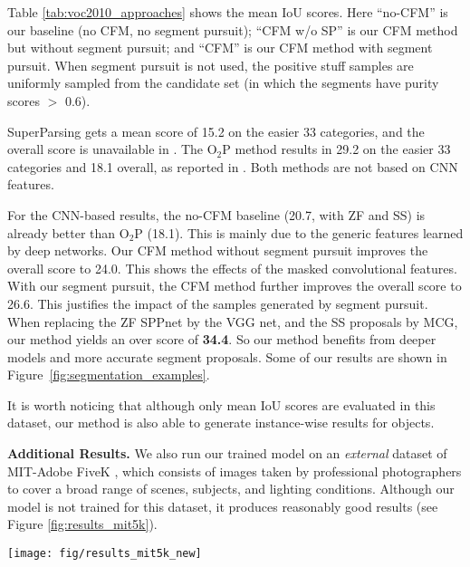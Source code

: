\documentclass[10pt,twocolumn,letterpaper]{article}
\begin{document}
Table \ref{tab:voc2010_approaches} shows the mean IoU scores. Here ``no-CFM'' is our baseline (no CFM, no segment pursuit); ``CFM w/o SP'' is our CFM method but without segment pursuit; and ``CFM'' is our CFM method with segment pursuit. When segment pursuit is not used, the positive stuff samples are uniformly sampled from the candidate set (in which the segments have purity scores $>$ 0.6).

SuperParsing \cite{tighe2010superparsing} gets a mean score of 15.2 on the easier 33 categories, and the overall score is unavailable in \cite{mottaghi2014role}. The O$_2$P method \cite{carreira2012semantic} results in 29.2 on the easier 33 categories and 18.1 overall, as reported in \cite{mottaghi2014role}. Both methods are not based on CNN features.

For the CNN-based results, the no-CFM baseline (20.7, with ZF and SS) is already better than O$_2$P (18.1). This is mainly due to the generic features learned by deep networks. Our CFM method without segment pursuit improves the overall score to 24.0. This shows the effects of the masked convolutional features. With our segment pursuit, the CFM method further improves the overall score to 26.6. This justifies the impact of the samples generated by segment pursuit. When replacing the ZF SPPnet by the VGG net, and the SS proposals by MCG, our method yields an over score of \textbf{34.4}. So our method benefits from deeper models and more accurate segment proposals.
Some of our results are shown in Figure~\ref{fig:segmentation_examples}.

It is worth noticing that although only mean IoU scores are evaluated in this dataset, our method is also able to generate instance-wise results for objects.

\vspace{6pt}
\noindent\textbf{Additional Results.}
We also run our trained model on an \emph{external} dataset of MIT-Adobe FiveK \cite{vladimir2011fivek}, which consists of images taken by professional photographers to cover a broad range of scenes, subjects, and lighting conditions. Although our model is not trained for this dataset, it produces reasonably good results (see Figure \ref{fig:results_mit5k}).

\begin{figure*}[t]
\centering
\texttt{[image: fig/results\_mit5k\_new]}
\caption{Some visual results of our trained model (with VGG and MCG) for \textbf{cross-dataset joint object and stuff segmentation}. The network is trained on the PASCAL-CONTEXT training set \cite{mottaghi2014role}, and is applied on MIT-Adobe FiveK \cite{vladimir2011fivek}.}
\label{fig:results_mit5k}
\end{figure*}
\end{document}
